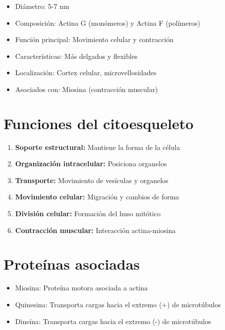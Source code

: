 \begin{itemize}
    \item Diámetro: 5-7 nm
    \item Composición: Actina G (monómeros) y Actina F (polímeros)
    \item Función principal: Movimiento celular y contracción
    \item Características: Más delgados y flexibles
    \item Localización: Cortex celular, microvellosidades
    \item Asociados con: Miosina (contracción muscular)
\end{itemize}

\section{Funciones del citoesqueleto}

\begin{enumerate}
    \item \textbf{Soporte estructural:} Mantiene la forma de la célula
    \item \textbf{Organización intracelular:} Posiciona organelos
    \item \textbf{Transporte:} Movimiento de vesículas y organelos
    \item \textbf{Movimiento celular:} Migración y cambios de forma
    \item \textbf{División celular:} Formación del huso mitótico
    \item \textbf{Contracción muscular:} Interacción actina-miosina
\end{enumerate}

\section{Proteínas asociadas}

\begin{itemize}
    \item Miosina: Proteína motora asociada a actina
    \item Quinesina: Transporta cargas hacia el extremo (+) de microtúbulos
    \item Dineína: Transporta cargas hacia el extremo (-) de microtúbulos
\end{itemize}